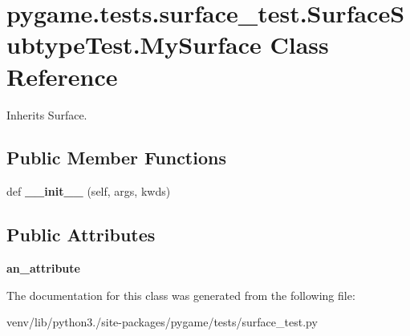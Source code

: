 \hypertarget{classpygame_1_1tests_1_1surface__test_1_1_surface_subtype_test_1_1_my_surface}{}\section{pygame.\+tests.\+surface\+\_\+test.\+Surface\+Subtype\+Test.\+My\+Surface Class Reference}
\label{classpygame_1_1tests_1_1surface__test_1_1_surface_subtype_test_1_1_my_surface}


Inherits Surface.

\subsection*{Public Member Functions}
\begin{DoxyCompactItemize}
\item 
\mbox{\label{classpygame_1_1tests_1_1surface__test_1_1_surface_subtype_test_1_1_my_surface_a54c880b9d1e557be85209aae9b33bee6}} 
def {\bfseries \+\_\+\+\_\+init\+\_\+\+\_\+} (self, args, kwds)
\end{DoxyCompactItemize}
\subsection*{Public Attributes}
\begin{DoxyCompactItemize}
\item 
\mbox{\label{classpygame_1_1tests_1_1surface__test_1_1_surface_subtype_test_1_1_my_surface_a0b76732261406f838034dcbb9e4145d3}} 
{\bfseries an\+\_\+attribute}
\end{DoxyCompactItemize}


The documentation for this class was generated from the following file\+:\begin{DoxyCompactItemize}
\item 
venv/lib/python3./site-\/packages/pygame/tests/surface\+\_\+test.\+py\end{DoxyCompactItemize}
